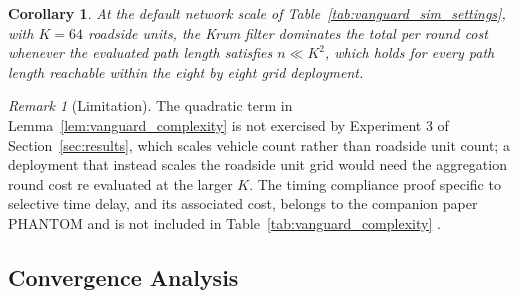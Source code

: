 \documentclass[final,5p,twocolumn]{elsarticle}
\newtheorem{corollary}[lemma]{Corollary}
\theoremstyle{remark}
\newtheorem{remark}{Remark}
\theoremstyle{plain}
\begin{document}
\begin{corollary}
	At the default network scale of Table~\ref{tab:vanguard_sim_settings},
	with $K{=}64$ roadside units, the Krum filter dominates the total per
	round cost whenever the evaluated path length satisfies $n \ll K^2$,
	which holds for every path length reachable within the eight by eight
	grid deployment.
\end{corollary}

\begin{remark}[Limitation]
	The quadratic term in Lemma~\ref{lem:vanguard_complexity} is not
	exercised by Experiment 3 of Section~\ref{sec:results}, which scales
	vehicle count rather than roadside unit count; a deployment that
	instead scales the roadside unit grid would need the aggregation round
	cost re evaluated at the larger $K$. The timing compliance proof
	specific to selective time delay, and its associated cost, belongs to
	the companion paper PHANTOM and is not included in
	Table~\ref{tab:vanguard_complexity} \cite{Phantom2026}.
\end{remark}

\subsection{Convergence Analysis}
\label{app:convergence}
\end{document}
